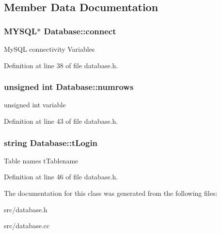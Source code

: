 \subsection{Member Data Documentation}
\hypertarget{classDatabase_aa232b806b05ef654cd5579bca5f1dbad}{
\subsubsection[{connect}]{\setlength{\rightskip}{0pt plus 5cm}M\-Y\-S\-Q\-L$\ast$ Database\-::connect\hspace{0.3cm}{\ttfamily [protected]}}}\label{classDatabase_aa232b806b05ef654cd5579bca5f1dbad}
My\-S\-Q\-L connectivity Variables 

Definition at line 38 of file database.\-h.

\hypertarget{classDatabase_a02965883689dd1d8007c86cebf6df89e}{
\subsubsection[{numrows}]{\setlength{\rightskip}{0pt plus 5cm}unsigned int Database\-::numrows\hspace{0.3cm}{\ttfamily [protected]}}}\label{classDatabase_a02965883689dd1d8007c86cebf6df89e}
unsigned int variable 

Definition at line 43 of file database.\-h.

\hypertarget{classDatabase_acd64ff0e98b28cd1c6928a1236634521}{
\subsubsection[{t\-Login}]{\setlength{\rightskip}{0pt plus 5cm}string Database\-::t\-Login\hspace{0.3cm}{\ttfamily [protected]}}}\label{classDatabase_acd64ff0e98b28cd1c6928a1236634521}
Table names t\-Tablename 

Definition at line 46 of file database.\-h.



The documentation for this class was generated from the following files\-:\begin{DoxyCompactItemize}
\item 
src/database.\-h\item 
src/database.\-cc\end{DoxyCompactItemize}
